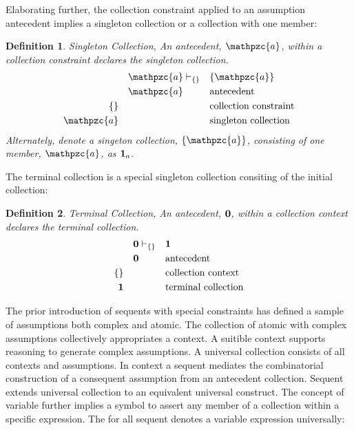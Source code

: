 \documentclass[aps,twocolumn,secnumarabic,nobalancelastpage,amsmath,amssymb,
amsthm,nofootinbib,parskip=full]{revtex4}
\numberwithin{equation}{section}
\newtheorem{definition}{Definition}[section]
\newcommand{\obk}[1]{\mathpzc{#1}}
\newcommand{\catN}[1]{\mathbf{\large #1}}
\newcommand{\singleton}[1]{\catN{1}_{#1}}
\begin{document}
Elaborating further, the collection constraint applied to an
assumption antecedent implies a singleton collection or a
collection with one member:

\begin{definition}{Singleton Collection}\label{def:singletoncollection},
  An antecedent, $\obk{a}$, within a collection constraint declares the
  singleton collection.
  \begin{equation*}
  \begin{array}{rll}
   &\obk{a}\vdash_{\{\}}&\{\obk{a}\} \\[3pt]
   &\obk{a}\quad&\text{antecedent} \\[3pt]
   \{\}&\quad&\text{collection constraint} \\[3pt]
   \obk{a}&\quad&\text{singleton collection}
  \end{array}
  \end{equation*}
Alternately, denote a singeton collection, $\{\obk{a}\}$,
consisting of one member, $\obk{a}$, as $\singleton{a}$.
\end{definition}

The terminal collection is a special singleton collection consiting of the
initial collection:

\begin{definition}{Terminal Collection}\label{def:singletoncollection},
  An antecedent, $\catN{0}$, within a collection context declares the
  terminal collection.
  \begin{equation*}
  \begin{array}{rll}
   &\catN{0}\vdash_{\{\}}&\catN{1} \\[3pt]
   &\catN{0}\quad&\text{antecedent} \\[3pt]
   \{\}&\quad&\text{collection context} \\[3pt]
   \catN{1}&\quad&\text{terminal collection}
  \end{array}
  \end{equation*}
\end{definition}

The prior introduction of sequents with special constraints
has defined a sample of assumptions both complex and atomic.
The collection of atomic with complex assumptions
collectively appropriates a context.
A suitible context supports reasoning to generate complex assumptions.
A universal collection consists of all contexts and assumptions.
In context a sequent mediates the combinatorial construction of a
consequent assumption from an antecedent collection.
Sequent extends universal collection to an equivalent universal construct.
The concept of variable further implies a symbol to assert any member
of a collection within a specific expression. 
The for all sequent denotes a variable expression universally:
\end{document}
